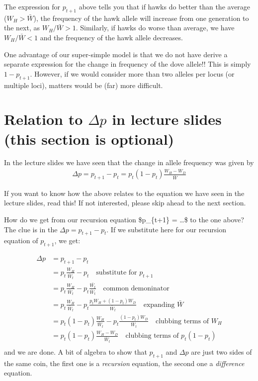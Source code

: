 \documentclass[
]{book}
\begin{document}
The expression for \(p_{t+1}\) above tells you that if hawks do better than the average (\(W_{H} > \bar{W}\)), the frequency of the hawk allele will increase from one generation to the next, as \(W_{H}/\bar{W} > 1\). Similarly, if hawks do worse than average, we have \(W_{H}/\bar{W} < 1\) and the frequency of the hawk allele decreases.

One advantage of our super-simple model is that we do not have derive a separate expression for the change in frequency of the dove allele!! This is simply \(1-p_{t+1}\). However, if we would consider more than two alleles per locus (or multiple loci), matters would be (far) more difficult.

\section{\texorpdfstring{Relation to \(\Delta p\) in lecture slides (this section is optional)}{Relation to \textbackslash Delta p in lecture slides (this section is optional)}}\label{relation-to-delta-p-in-lecture-slides-this-section-is-optional}

In the lecture slides we have seen that the change in allele frequency was given by
\begin{align}
\Delta p = p_{t+1} - p_{t} = p_{t} \left ( 1 - p_{t} \right ) \frac{ W_{H} - W_{D}}{\bar{W}}
\end{align}

If you want to know how the above relates to the equation we have seen in the lecture slides, read this! If not interested, please skip ahead to the next section.

How do we get from our recursion equation \$p\_\{t+1\} = \ldots \$ to the one above?
The clue is in the \(\Delta p = p_{t+1} - p_{t}\). If we substitute here for our recursion equation of \(p_{t+1}\), we get:

\begin{align}
\Delta p &= p_{t+1} - p_{t} \\
&= p_{t}  \frac{W_{H}}{\bar{W}_{t}} - p_{t} \quad \text{substitute for }p_{t+1} \\
&= p_{t}  \frac{W_{H}}{\bar{W}_{t}} - p_{t} \frac{\bar{W_{t}}}{\bar{W}_{t}} \quad \text{common demoninator} \\
&= p_{t}  \frac{W_{H}}{\bar{W}_{t}} - p_{t} \frac{p_{t} W_{H} + \left (1  - p_{t}\right ) W_{D} }{\bar{W}_{t}} \quad \text{expanding }\bar{W} \\
&= p_{t} \left (1 - p_{t} \right )  \frac{W_{H}}{\bar{W}_{t}} - p_{t} \frac{\left (1  - p_{t}\right ) W_{D} }{\bar{W}_{t}} \quad \text{clubbing terms of }W_{H} \\
&= p_{t} \left (1 - p_{t} \right ) \frac{W_{H} - W_{D}}{\bar{W}_{t}} \quad \text{clubbing terms of }p_{t} \left(1-p_{t} \right) \\
\end{align}
and we are done. A bit of algebra to show that \(p_{t+1}\) and \(\Delta p\) are just two sides of the same coin, the first one is a \emph{recursion} equation, the second one a \emph{difference} equation.
\end{document}
